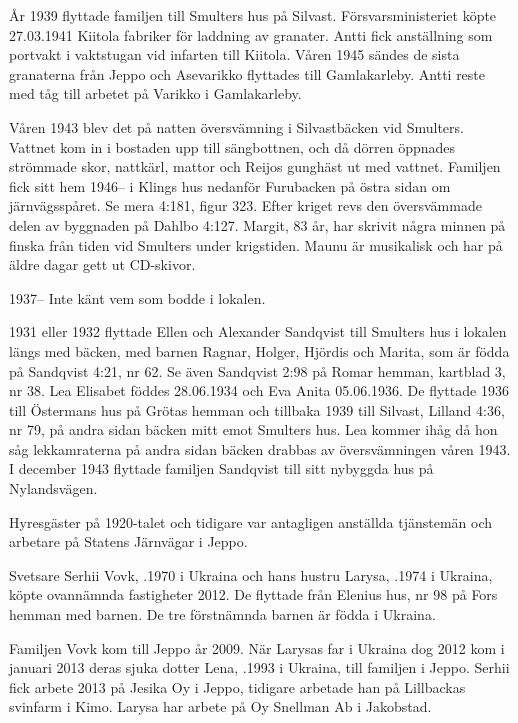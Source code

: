 År 1939 flyttade familjen till Smulters hus på Silvast. Försvarsministeriet köpte 27.03.1941 Kiitola fabriker för laddning av	granater. Antti fick anställning som portvakt i vaktstugan vid infarten till	Kiitola. Våren 1945 sändes de sista granaterna från Jeppo och	Asevarikko flyttades till Gamlakarleby. Antti reste med tåg till arbetet på Varikko i 	Gamlakarleby.

Våren 1943 blev det på natten översvämning i Silvastbäcken vid Smulters. Vattnet kom in i bostaden upp till sängbottnen, och då dörren öppnades strömmade skor, nattkärl, mattor och Reijos gunghäst ut med vattnet. Familjen fick sitt hem 1946-- i Klings hus nedanför Furubacken på östra sidan om 	järnvägsspåret. Se mera 4:181, figur 323. Efter kriget revs den översvämmade delen av byggnaden på Dahlbo 4:127. Margit, 83 år, har	skrivit några minnen på finska från tiden vid Smulters under krigstiden. Maunu är musikalisk och har på äldre dagar gett ut CD-skivor.

1937-- Inte känt vem som bodde i lokalen.

1931 eller 1932 flyttade Ellen och Alexander Sandqvist till Smulters	hus i lokalen längs med bäcken, med barnen Ragnar, Holger, Hjördis	och Marita, som är födda på Sandqvist 4:21, nr 62. Se även Sandqvist	2:98 på Romar hemman, kartblad 3, nr 38. Lea Elisabet föddes 28.06.1934 och Eva Anita 05.06.1936. De flyttade 1936 till Östermans hus på Grötas hemman och	tillbaka 1939 till Silvast, Lilland 4:36, nr 79, på andra sidan bäcken mitt emot Smulters hus. Lea kommer ihåg då hon såg lekkamraterna på andra sidan bäcken drabbas av översvämningen våren 1943. I december 1943 flyttade familjen Sandqvist till sitt nybyggda hus på Nylandsvägen.

Hyresgäster på 1920-talet och tidigare var antagligen anställda tjänstemän och arbetare på Statens Järnvägar i Jeppo.




Svetsare Serhii Vovk, .1970 i Ukraina och hans hustru Larysa, .1974 i Ukraina, köpte ovannämnda fastigheter 2012. De flyttade från Elenius hus, nr 98 på Fors hemman med barnen.	De tre förstnämnda barnen är födda i Ukraina.
\begin{jhchildren}
  \item {}
  \item {}
  \item {}
  \item {}
\end{jhchildren}
Familjen Vovk kom  till Jeppo år 2009. När Larysas far i Ukraina dog 	2012 kom i januari 2013 deras sjuka dotter Lena,  .1993 i Ukraina, till familjen i Jeppo. Serhii fick arbete 2013 på Jesika Oy i Jeppo, tidigare arbetade han på 	Lillbackas svinfarm i Kimo. Larysa har arbete på Oy Snellman Ab i	Jakobstad.

